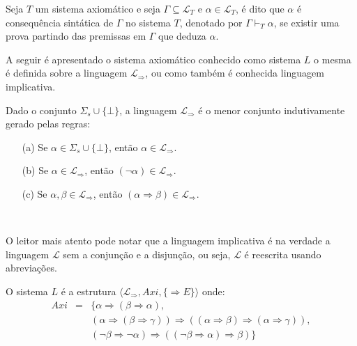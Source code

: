 \begin{definicao}\label{def:ConsequenciaAxiomatica}
  Seja $T$ um sistema axiomático e seja $\Gamma \subseteq \mathcal{L}_T$ e $\alpha \in \mathcal{L}_T$, é dito que $\alpha$ é consequência sintática de $\Gamma$ no sistema $T$, denotado por $\Gamma \vdash_T \alpha$, se existir uma prova partindo das premissas em $\Gamma$ que deduza $\alpha$.
\end{definicao}

A seguir é apresentado o sistema axiomático conhecido como sistema $L$ o mesma é definida sobre a linguagem $\mathcal{L}_\Rightarrow$, ou como também é conhecida linguagem implicativa.

\begin{definicao}\label{def:LinguagemL}
  Dado o conjunto $\Sigma_s \cup \{\bot\}$, a linguagem $\mathcal{L}_\Rightarrow$ é o menor conjunto indutivamente gerado pelas regras:
  \begin{itemize}
      \item[(a)] Se $\alpha \in \Sigma_s \cup \{\bot\}$, então $\alpha \in \mathcal{L}_\Rightarrow$.
      \item[(b)] Se $\alpha \in \mathcal{L}_\Rightarrow$, então $(\neg \alpha) \in \mathcal{L}_\Rightarrow$.
      \item[(c)] Se $\alpha, \beta \in \mathcal{L}_\Rightarrow$, então $(\alpha \Rightarrow \beta) \in \mathcal{L}_\Rightarrow$.
  \end{itemize}
\end{definicao}

\ 

O leitor mais atento pode notar que a linguagem implicativa é na verdade a linguagem $\mathcal{L}$ sem a conjunção e a disjunção, ou seja, $\mathcal{L}$ é reescrita usando abreviações.

\begin{definicao}[Sistema $L$]\label{def:SistemaL}
  \cite{mendelson2009livro} O sistema $L$ é a  estrutura $\langle \mathcal{L}_\Rightarrow, Axi, \{ \Rightarrow E\}\rangle$ onde: 
  \begin{eqnarray*}
    Axi & = & \Big\{\alpha \Rightarrow (\beta \Rightarrow \alpha),\\
    & & (\alpha \Rightarrow (\beta \Rightarrow \gamma)) \Rightarrow ((\alpha \Rightarrow \beta) \Rightarrow (\alpha \Rightarrow \gamma)),\\ 
    & & (\neg \beta \Rightarrow \neg \alpha) \Rightarrow ((\neg \beta \Rightarrow \alpha) \Rightarrow \beta)\Big\}
  \end{eqnarray*}
\end{definicao}

